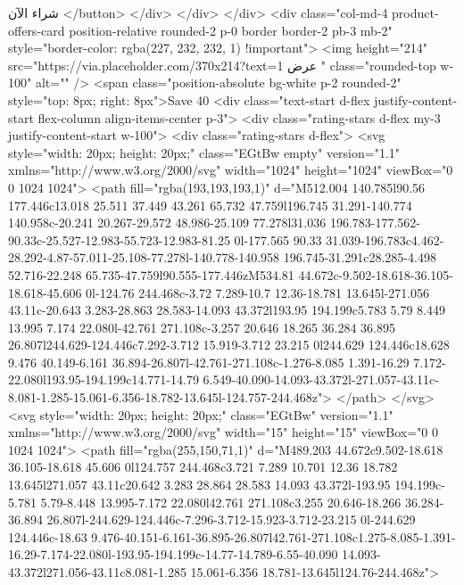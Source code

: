                   شراء الآن
                </button>
              </div>
            </div>
          </div>
          <div class="col-md-4 product-offers-card position-relative rounded-2 p-0 border border-2 pb-3 mb-2"
            style="border-color: rgba(227, 232, 232, 1) !important">
            <img height="214" src="https://via.placeholder.com/370x214?text=عرض 1 " class="rounded-top w-100"
              alt="" />
            <span class="position-absolute bg-white p-2 rounded-2" style="top: 8px; right: 8px">Save 40%
            <div class="text-start d-flex justify-content-start flex-column align-items-center p-3">
              <div class="rating-stars d-flex my-3 justify-content-start w-100">
                <div class="rating-stars d-flex">
                  <svg style="width: 20px; height: 20px;" class="EGtBw empty" version="1.1"
                    xmlns="http://www.w3.org/2000/svg" width="1024" height="1024" viewBox="0 0 1024 1024">
                    <path fill="rgba(193,193,193,1)"
                      d="M512.004 140.785l90.56 177.446c13.018 25.511 37.449 43.261 65.732 47.759l196.745 31.291-140.774 140.958c-20.241 20.267-29.572 48.986-25.109 77.278l31.036 196.783-177.562-90.33c-25.527-12.983-55.723-12.983-81.25 0l-177.565 90.33 31.039-196.783c4.462-28.292-4.87-57.011-25.108-77.278l-140.778-140.958 196.745-31.291c28.285-4.498 52.716-22.248 65.735-47.759l90.555-177.446zM534.81 44.672c-9.502-18.618-36.105-18.618-45.606 0l-124.76 244.468c-3.72 7.289-10.7 12.36-18.781 13.645l-271.056 43.11c-20.643 3.283-28.863 28.583-14.093 43.372l193.95 194.199c5.783 5.79 8.449 13.995 7.174 22.080l-42.761 271.108c-3.257 20.646 18.265 36.284 36.895 26.807l244.629-124.446c7.292-3.712 15.919-3.712 23.215 0l244.629 124.446c18.628 9.476 40.149-6.161 36.894-26.807l-42.761-271.108c-1.276-8.085 1.391-16.29 7.172-22.080l193.95-194.199c14.771-14.79 6.549-40.090-14.093-43.372l-271.057-43.11c-8.081-1.285-15.061-6.356-18.782-13.645l-124.757-244.468z">
                    </path>
                  </svg>
                  <svg style="width: 20px; height: 20px;" class="EGtBw" version="1.1"
                    xmlns="http://www.w3.org/2000/svg" width="15" height="15" viewBox="0 0 1024 1024">
                    <path fill="rgba(255,150,71,1)"
                      d="M489.203 44.672c9.502-18.618 36.105-18.618 45.606 0l124.757 244.468c3.721 7.289 10.701 12.36 18.782 13.645l271.057 43.11c20.642 3.283 28.864 28.583 14.093 43.372l-193.95 194.199c-5.781 5.79-8.448 13.995-7.172 22.080l42.761 271.108c3.255 20.646-18.266 36.284-36.894 26.807l-244.629-124.446c-7.296-3.712-15.923-3.712-23.215 0l-244.629 124.446c-18.63 9.476-40.151-6.161-36.895-26.807l42.761-271.108c1.275-8.085-1.391-16.29-7.174-22.080l-193.95-194.199c-14.77-14.789-6.55-40.090 14.093-43.372l271.056-43.11c8.081-1.285 15.061-6.356 18.781-13.645l124.76-244.468z">
